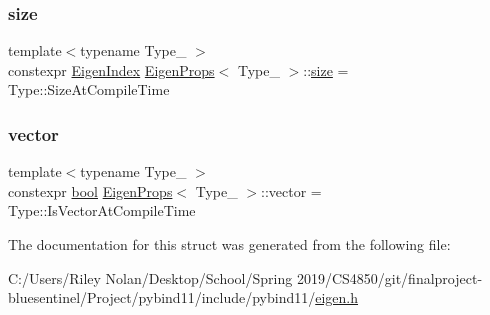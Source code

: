 \subsubsection{\texorpdfstring{size}{size}}
{\footnotesize\ttfamily template$<$typename Type\+\_\+ $>$ \\
constexpr \mbox{\hyperlink{eigen_8h_a4e595ab182718d84a409dd05e0829bdd}{Eigen\+Index}} \mbox{\hyperlink{struct_eigen_props}{Eigen\+Props}}$<$ Type\+\_\+ $>$\+::\mbox{\hyperlink{_s_d_l__opengl__glext_8h_a3d1e3edfcf61ca2d831883e1afbad89e}{size}} = Type\+::\+Size\+At\+Compile\+Time\hspace{0.3cm}{\ttfamily [static]}}

\mbox{\label{struct_eigen_props_a6c26ad4c67abd91b08285b63afed9ab9}} 
\subsubsection{\texorpdfstring{vector}{vector}}
{\footnotesize\ttfamily template$<$typename Type\+\_\+ $>$ \\
constexpr \mbox{\hyperlink{asdl_8h_af6a258d8f3ee5206d682d799316314b1}{bool}} \mbox{\hyperlink{struct_eigen_props}{Eigen\+Props}}$<$ Type\+\_\+ $>$\+::vector = Type\+::\+Is\+Vector\+At\+Compile\+Time\hspace{0.3cm}{\ttfamily [static]}}



The documentation for this struct was generated from the following file\+:\begin{DoxyCompactItemize}
\item 
C\+:/\+Users/\+Riley Nolan/\+Desktop/\+School/\+Spring 2019/\+C\+S4850/git/finalproject-\/bluesentinel/\+Project/pybind11/include/pybind11/\mbox{\hyperlink{eigen_8h}{eigen.\+h}}\end{DoxyCompactItemize}
